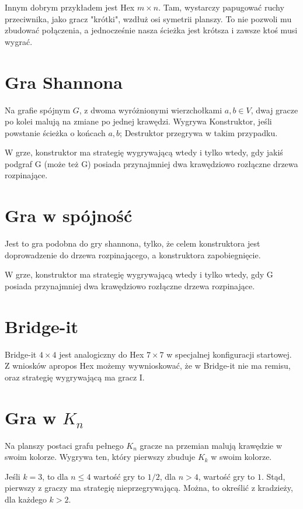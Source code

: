 \documentclass{../notatki}
\begin{document}
Innym dobrym przykładem jest Hex $m \times n$. Tam, wystarczy papugować ruchy
przeciwnika, jako gracz "krótki", wzdłuż osi symetrii planszy. To nie pozwoli mu
zbudować połączenia, a jednocześnie nasza ścieżka jest krótsza i zawsze ktoś
musi wygrać.

\section{Gra Shannona}

Na grafie spójnym $G$, z dwoma wyróżnionymi wierzchołkami $a, b \in V$, dwaj
gracze po kolei malują na zmiane po jednej krawędzi. Wygrywa Konstruktor,
jeśli powstanie ścieżka o końcach $a, b$; Destruktor przegrywa w takim
przypadku.

W grze, konstruktor ma strategię wygrywającą wtedy i tylko wtedy, gdy
jakiś podgraf G (może też G) posiada
przynajmniej dwa krawędziowo rozłączne drzewa rozpinające.

\section{Gra w spójność}

Jest to gra podobna do gry shannona, tylko, że celem konstruktora jest
doprowadzenie do drzewa rozpinającego, a konstruktora zapobiegnięcie.

W grze, konstruktor ma strategię wygrywającą wtedy i tylko wtedy, gdy G posiada
przynajmniej dwa krawędziowo rozłączne drzewa rozpinające.

\section{Bridge-it}

Bridge-it $4 \times 4$ jest analogiczny do Hex $7 \times 7$ w specjalnej
konfiguracji startowej. Z wniosków apropos Hex możemy wywnioskować, że
w Bridge-it nie ma remisu, oraz strategię wygrywającą ma gracz I.

\section{Gra w \texorpdfstring{$K_n$}{Kn}}

Na planszy postaci grafu pełnego $K_n$ gracze na przemian malują krawędzie
w swoim kolorze. Wygrywa ten, który pierwszy zbuduje $K_k$ w swoim kolorze.

Jeśli $k = 3$, to dla $n \leq 4$ wartość gry to $1/2$, dla $n > 4$,
wartość gry to $1$. Stąd, pierwszy z graczy ma strategię
nieprzegrywającą. Można, to określić z kradzieży, dla każdego $k > 2$.
\end{document}
